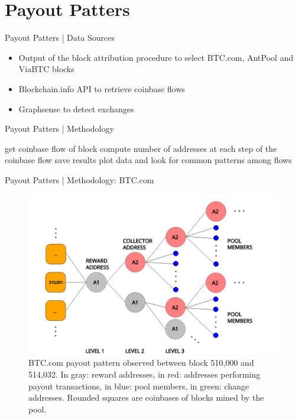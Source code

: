 \documentclass[10pt]{beamer}
\begin{document}
\section{Payout Patters} 
\begin{frame}[fragile]{Payout Patters | Data Sources}
    \begin{itemize}
        \item Output of the block attribution procedure to select BTC.com, AntPool and ViaBTC blocks
        \item Blockchain.info API to retrieve coinbase flows
        \item Graphsense to detect exchanges
    \end{itemize}
\end{frame}

\begin{frame}[fragile]{Payout Patters | Methodology}
    \begin{algorithm}[H]
        \caption{Looking for payout patterns in BTC.com, AntPool and ViaBTC.}\label{algo:blocks_addresses}
        \begin{algorithmic}[1]
                    \State get coinbase flow of block
                    \State compute number of addresses at each step of the coinbase flow
                    \State save results
                \EndFor
                \State plot data and look for common patterns among flows
            \EndFor
        \end{algorithmic}
    \end{algorithm}
\end{frame}

\begin{frame}[fragile]{Payout Patters | Methodology: BTC.com}
    \begin{figure}
        \includegraphics[width=.8\textwidth]{images/flow_BTCcom_example1.png}
        \caption{BTC.com payout pattern observed between block 510,000 and 514,032. In gray: reward addresses, in red: addresses performing payout transactions, in blue: pool members, in green: change addresses. Rounded squares are coinbases of blocks mined by the pool.}
        \label{fig:flow_example}
    \end{figure}
\end{frame}
\end{document}
